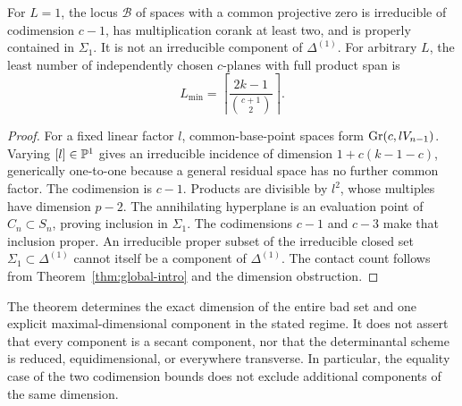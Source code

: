 \begin{corollary}\label{cor:basepoint}
For $L=1$, the locus $\mathcal B$ of spaces with a common projective zero is irreducible of codimension $c-1$, has multiplication corank at least two, and is properly contained in $\Sigma_1$. It is not an irreducible component of $\Delta^{(1)}$. For arbitrary $L$, the least number of independently chosen $c$-planes with full product span is
\[
 L_{\min}=\left\lceil\frac{2k-1}{\binom{c+1}{2}}\right\rceil.
\]
\end{corollary}
\begin{proof}
For a fixed linear factor $l$, common-base-point spaces form $\operatorname{Gr}(c,lV_{n-1})$. Varying $[l]\in\mathbb P^1$ gives an irreducible incidence of dimension $1+c(k-1-c)$, generically one-to-one because a general residual space has no further common factor. The codimension is $c-1$. Products are divisible by $l^2$, whose multiples have dimension $p-2$. The annihilating hyperplane is an evaluation point of $C_n\subset S_n$, proving inclusion in $\Sigma_1$. The codimensions $c-1$ and $c-3$ make that inclusion proper. An irreducible proper subset of the irreducible closed set $\Sigma_1\subset\Delta^{(1)}$ cannot itself be a component of $\Delta^{(1)}$. The contact count follows from Theorem~\ref{thm:global-intro} and the dimension obstruction.
\end{proof}
The theorem determines the exact dimension of the entire bad set and one explicit maximal-dimensional component in the stated regime. It does not assert that every component is a secant component, nor that the determinantal scheme is reduced, equidimensional, or everywhere transverse. In particular, the equality case of the two codimension bounds does not exclude additional components of the same dimension.
